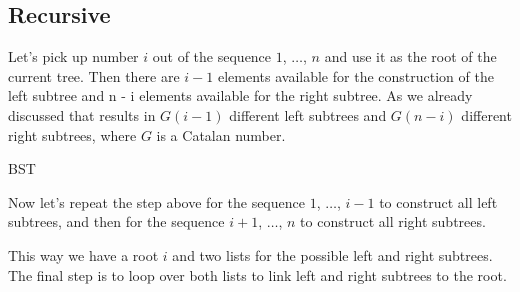 \subsection{Recursive}
Let's pick up number $ i $ out of the sequence $1$, $\ldots$, $n$ and use it as the root of the current tree. Then there are $ i - 1 $ elements available for the construction of the left subtree and n - i elements available for the right subtree. As we already discussed that results in $ G(i - 1) $ different left subtrees and $ G(n - i) $ different right subtrees, where $G$ is a Catalan number.

BST

Now let's repeat the step above for the sequence $1$, $\ldots$, $i - 1$ to construct all left subtrees, and then for the sequence $i + 1$, $\ldots$, $n$ to construct all right subtrees.

This way we have a root $i$ and two lists for the possible left and right subtrees. The final step is to loop over both lists to link left and right subtrees to the root.

